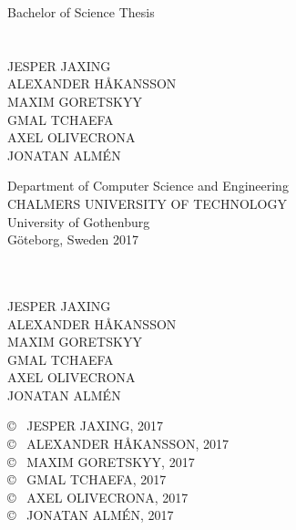 \newpage
\setcounter{page}{1}
\thispagestyle{empty}
\begin{center}
	\large Bachelor of Science Thesis\\[4cm]		%
	\textbf{\large \varthetitle} \\[0.7cm]
	{\large \varthesubtitle}\\[1cm]
	{\large JESPER JAXING}\\
	{\large ALEXANDER HÅKANSSON} \\
	{\large MAXIM GORETSKYY} \\
	{\large GMAL TCHAEFA } \\
	{\large AXEL OLIVECRONA} \\
	{\large JONATAN ALMÉN} \
	
	\vfill	
	\begin{figure}[H]
	\centering
	\end{figure}	\vspace{5mm}	
	
	Department of Computer Science and Engineering \\
	CHALMERS UNIVERSITY OF TECHNOLOGY \\
	University of Gothenburg \\[0.5cm]
	Göteborg, Sweden 2017 \\
\end{center}


\newpage
\thispagestyle{plain}
\textbf{\varthetitle}\\
\varthesubtitle
\vspace*{0.5cm}\\
JESPER JAXING\\
ALEXANDER HÅKANSSON\\
MAXIM GORETSKYY\\
GMAL TCHAEFA\\
AXEL OLIVECRONA\\
JONATAN ALMÉN\setlength{\parskip}{0.7cm}

\copyright ~ JESPER JAXING, 2017\\
\copyright ~ ALEXANDER HÅKANSSON, 2017\\
\copyright ~ MAXIM GORETSKYY, 2017\\
\copyright ~ GMAL TCHAEFA, 2017\\
\copyright ~ AXEL OLIVECRONA, 2017\\
\copyright ~ JONATAN ALMÉN, 2017 \setlength{\parskip}{0.5cm}

